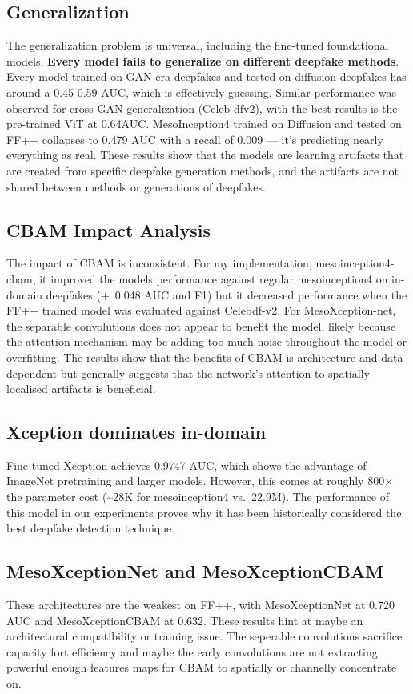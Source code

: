 \documentclass[conference]{IEEEtran}
\begin{document}
\subsection{Generalization}
The generalization problem is universal, including the fine-tuned foundational models. \textbf{Every model fails to generalize on different deepfake methods}. Every model trained on GAN-era deepfakes and tested on diffusion deepfakes has around a 0.45-0.59 AUC, which is effectively guessing. Similar performance was observed for cross-GAN generalization (Celeb-dfv2), with the best results is the pre-trained ViT at 0.64AUC. MesoInception4 trained on Diffusion and tested on FF++ collapses to 0.479 AUC with a recall of 0.009 — it's predicting nearly everything as real. These results show that the models are learning artifacts that are created from specific deepfake generation methods, and the artifacts are not shared between methods or generations of deepfakes.

\subsection{CBAM Impact Analysis}
The impact of CBAM is inconsistent. For my implementation, mesoinception4-cbam, it improved the models performance against regular mesoinception4 on in-domain deepfakes (+~0.048 AUC and F1) but it decreased performance when the FF++ trained model was evaluated against Celebdf-v2. For MesoXception-net, the separable convolutions does not appear to benefit the model, likely because the attention mechanism may be adding too much noise throughout the model or overfitting. The results show that the benefits of CBAM is architecture and data dependent but generally suggests that the network's attention
to spatially localised artifacts is beneficial.

\subsection{Xception dominates in-domain}
Fine-tuned Xception achieves 0.9747 AUC, which shows the advantage of
ImageNet pretraining and larger models. However, this comes at roughly
800$\times$ the parameter cost (\textasciitilde{}28K for mesoinception4 vs.\ 22.9M). The performance of this model in our experiments proves why it has been historically considered the best deepfake detection technique.

\subsection{MesoXceptionNet and MesoXceptionCBAM}
These architectures are the weakest on FF++, with MesoXceptionNet at 0.720 AUC and MesoXceptionCBAM at 0.632. These results hint at maybe an architectural compatibility or training issue. The seperable convolutions sacrifice capacity fort efficiency and maybe the early convolutions are not extracting powerful enough features maps for CBAM to spatially or channelly concentrate on.
\end{document}
